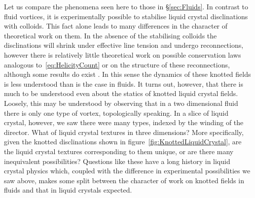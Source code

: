Let us compare the phenomena seen here to those in \S\ref{sec:Fluids}. In contrast to fluid vortices, it is experimentally possible to stabilise liquid crystal disclinations with colloids. This fact alone leads to many differences in the character of theoretical work on them. In the absence of the stabilising colloids the disclinations will shrink under effective line tension and undergo reconnections, however there is relatively little theoretical work on possible conservation laws analogous to~\eqref{eq:HelicityCount} or on the structure of these reconnections, although some results do exist \citep{Machon2017}. In this sense the dynamics of these knotted fields is less understood than is the case in fluids. It turns out, however, that there is much to be understood even about the statics of knotted liquid crystal fields. Loosely, this may be understood by observing that in a two dimensional fluid there is only one type of vortex, topologically speaking. In a slice of liquid crystal, however, we saw there were many types, indexed by the winding of the director. What of liquid crystal textures in three dimensions? More specifically, given the knotted disclinations shown in figure~\ref{fig:KnottedLiquidCrystal}, are the liquid crystal textures corresponding to them unique, or are there many inequivalent possibilities? Questions like these have a long history in liquid crystal physics which, coupled with the difference in experimental possibilities we saw above, makes some split between the character of work on knotted fields in fluids and that in liquid crystals expected.

